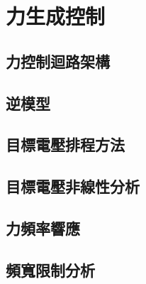 \chapter{力生成控制}
\label{c:force_generation}

\section{力控制迴路架構}
\label{sec:force_ctrl_arch}


\section{逆模型}
\label{sec:inverse_model}


\section{目標電壓排程方法}
\label{sec:vd_scheduling}


\section{目標電壓非線性分析}
\label{sec:vd_nonlinearity}


\section{力頻率響應}
\label{sec:force_bode}


\section{頻寬限制分析}
\label{sec:bw_limitation}

